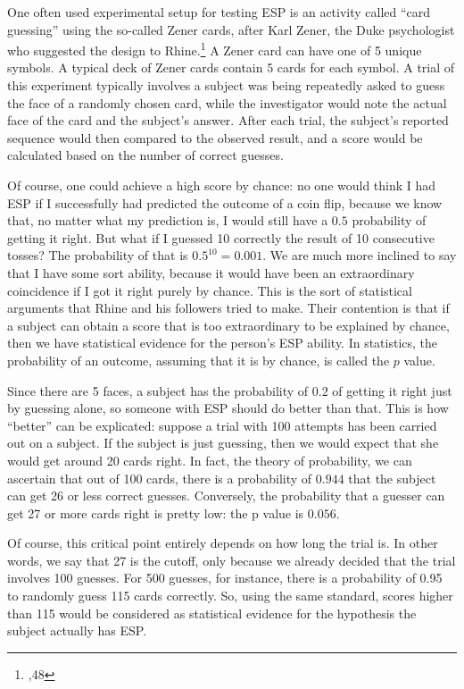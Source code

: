 One often used experimental setup for testing ESP is an activity called
``card guessing'' using the so-called Zener cards, after Karl Zener, the
Duke psychologist who suggested the design to Rhine.\footnote{\cite{rhineesp},48} A Zener card can have one of 5
unique symbols. A typical deck of Zener cards contain 5 cards for each
symbol. A trial of this experiment typically involves a subject was
being repeatedly asked to guess the face of a randomly chosen card,
while the investigator would note the actual face of the card and the
subject's answer. After each trial, the subject's reported sequence would then
compared to the observed result, and a score would be calculated based
on the number of correct guesses.

Of course, one could achieve a high score by chance: no one would think
I had ESP if I successfully had predicted the outcome of a coin flip,
because we know that, no matter what my prediction is, I would still
have a \(0.5\) probability of getting it right. But what if I guessed 10
correctly the result of 10 consecutive tosses? The probability of that
is \(0.5^{10} = 0.001\). We are much more inclined to say that I have
some sort ability, because it would have been an extraordinary
coincidence if I got it right purely by chance. This is the sort of
statistical arguments that Rhine and his followers tried to make. Their
contention is that if a subject can obtain a score that is too
extraordinary to be explained by chance, then we have statistical
evidence for the person's ESP ability. In statistics, the probability of
an outcome, assuming that it is by chance, is called the $p$ value.

Since there are 5 faces, a subject has the probability of \(0.2\) of
getting it right just by guessing alone, so someone with ESP should do
better than that. This is how ``better'' can be explicated: suppose a trial with 100 attempts has been carried out on a
subject. If the subject is just guessing, then we would expect that she
would get around 20 cards right. In fact, the theory of probability, we can ascertain that out of 100 cards, there is a
probability of \(0.944\) that the subject can get 26 or less correct
guesses. Conversely, the probability that a guesser can get 27 or more
cards right is pretty low: the p value is \(0.056\).

Of course, this critical point entirely depends on how long the trial
is. In other words, we say that 27 is the cutoff, only because we
already decided that the trial involves 100 guesses. For 500 guesses,
for instance, there is a probability of 0.95 to randomly guess 115 cards
correctly. So, using the same standard, scores higher than 115 would be
considered as statistical evidence for the hypothesis the subject
actually has ESP.

